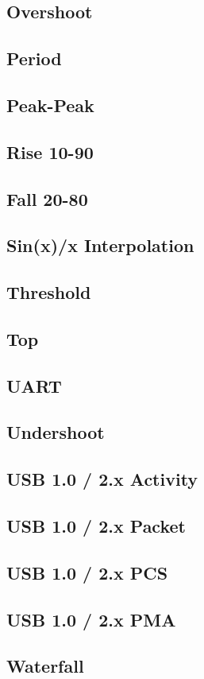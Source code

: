 \documentclass[11pt]{article}
\begin{document}
\subsection{Overshoot}
\subsection{Period}
\subsection{Peak-Peak}
\subsection{Rise 10-90}
\subsection{Fall 20-80}
\subsection{Sin(x)/x Interpolation}
\subsection{Threshold}
\subsection{Top}
\subsection{UART}
\subsection{Undershoot}
\subsection{USB 1.0 / 2.x Activity}
\subsection{USB 1.0 / 2.x Packet}
\subsection{USB 1.0 / 2.x PCS}
\subsection{USB 1.0 / 2.x PMA}
\subsection{Waterfall}
\end{document}
